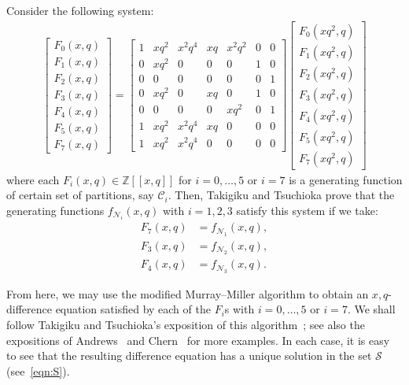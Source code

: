 \documentclass[ALCO,Unicode,published]{cedram}
\newcommand{\ZZ}{\mathbb{Z}}
\newcommand{\sC}{\mathscr{C}}
\newcommand{\sN}{\mathscr{N}}
\newcommand{\sS}{\mathscr{S}}
\begin{document}
Consider the following system:
\begin{align}
\begin{bmatrix}
F_0(x,q)\\
F_1(x,q)\\
F_2(x,q)\\
F_3(x,q)\\
F_4(x,q)\\
F_5(x,q)\\
F_7(x,q)
\end{bmatrix}
=
\begin{bmatrix} 
1&x{q}^{2}&{x}^{2}{q}^{4}&xq&{x}^{2}{q
}^{2}&0&0\\ 
0&x{q}^{2}&0&0&0&1&0\\ 
0&0&0&0&0&0&1\\ 
0&x{q}^{2}&0&xq&0&1&0\\ 
0&0&0&0&x{q}^{2}&0&1\\ 
1&x{q}^{2}&{x}^{2}{q}^{4}&xq&0&0&0\\
1&x{q}^{2}&{x}^{2}{q}^{4}&0&0&0&0
\end{bmatrix}
\begin{bmatrix}
F_0(xq^2,q)\\
F_1(xq^2,q)\\
F_2(xq^2,q)\\
F_3(xq^2,q)\\
F_4(xq^2,q)\\
F_5(xq^2,q)\\
F_7(xq^2,q)
\end{bmatrix}
\label{eqn:Ndiffeq}
\end{align}
where each $F_i(x,q)\in\ZZ[[x,q]]$ for $i=0,\dots,5$ or $i=7$ is a 
generating function of certain set of partitions, say $\sC_i$.
Then, Takigiku and Tsuchioka prove that the generating functions $f_{\sN_i}(x,q)$ with $i=1,2,3$ satisfy this system
if we take:
\begin{align}
F_7(x,q)&=f_{\sN_1}(x,q),\\
F_3(x,q)&=f_{\sN_2}(x,q),\\
F_4(x,q)&=f_{\sN_3}(x,q).
\end{align}

From here, we may use the modified Murray--Miller algorithm 
to obtain an $x,q$-difference equation satisfied by
each of the $F_i$s with $i=0,\dots,5$ or $i=7$.
We shall follow Takigiku and Tsuchioka's exposition of this algorithm~\cite{TakTsu-nandi}; see also the expositions of Andrews~\cite[Ch.\ 8]{And-book} and Chern~\cite{Che-linked} for more examples.
In each case, it is easy to see that the resulting difference equation has a unique
solution in the set $\sS$ (see~\eqref{eqn:S}).
\end{document}
